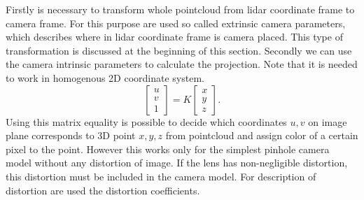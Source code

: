 Firstly is necessary to transform whole pointcloud from lidar coordinate frame to camera frame. For this purpose are used so called extrinsic camera parameters, which describes where in lidar coordinate frame is camera placed. This type of transformation is discussed at the beginning of this section. Secondly we can use the camera intrinsic parameters to calculate the projection. Note that it is needed to work in homogenous 2D coordinate system.
\begin{equation}
\begin{bmatrix}
u\\
v\\
1
\end{bmatrix}
= K \begin{bmatrix}
x\\
y\\
z
\end{bmatrix}.
\end{equation}
Using this matrix equality is possible to decide which coordinates $u,v$ on image plane corresponds to 3D point $x,y,z$ from pointcloud and assign color of a certain pixel to the point. However this works only for the simplest pinhole camera model without any distortion of image. If the lens has non-negligible distortion, this distortion must be included in the camera model. For description of distortion are used the distortion coefficients.